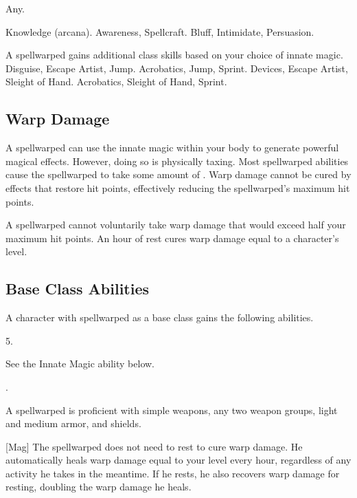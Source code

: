      Any.

     Knowledge (arcana).
     Awareness, Spellcraft.
     Bluff, Intimidate, Persuasion.

    A spellwarped gains additional class skills based on your choice of innate magic.
     Disguise, Escape Artist, Jump.
     Acrobatics, Jump, Sprint.
     Devices, Escape Artist, Sleight of Hand.
     Acrobatics, Sleight of Hand, Sprint.

    \subsection{Warp Damage}\label{Warp Damage}
        A spellwarped can use the innate magic within your body to generate powerful magical effects.
        However, doing so is physically taxing.
        Most spellwarped abilities cause the spellwarped to take some amount of .
        Warp damage cannot be cured by effects that restore hit points, effectively reducing the spellwarped's maximum hit points.

        A spellwarped cannot voluntarily take warp damage that would exceed half your maximum hit points.
        An hour of rest cures warp damage equal to a character's level.

    \subsection{Base Class Abilities}
        A character with spellwarped as a base class gains the following abilities.

         5.

         See the Innate Magic ability below.

         .

        A spellwarped is proficient with simple weapons, any two weapon groups, light and medium armor, and shields.

        [Mag]
        The spellwarped does not need to rest to cure warp damage.
        He automatically heals warp damage equal to your level every hour, regardless of any activity he takes in the meantime.
        If he rests, he also recovers warp damage for resting, doubling the warp damage he heals.

